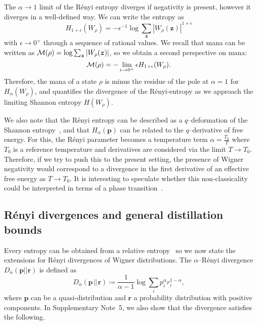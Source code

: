 \documentclass[
onecolumn,
superscriptaddress
]{revtex4-1}
\def\z{\boldsymbol{z}}
\def\r{\boldsymbol{r}}
\def\p{\boldsymbol{p}}
\def\M{{\cal M}}
\begin{document}
The $\alpha \rightarrow 1$ limit of the R\'{e}nyi entropy diverges if negativity is present, however it diverges in a well-defined way. We can write the entropy as 
\begin{equation}
	H_{1+\epsilon}(W_\rho) = -\epsilon^{-1} \log \sum_{\z} |W_\rho (\z)|^{1+\epsilon}
\end{equation} 
with $\epsilon \rightarrow 0^+$ through a sequence of rational values. We recall that mana can be written as $\M(\rho) = \log \sum_{\z} |W_\rho(\z)|$, so we obtain a second perspective on mana:
\begin{equation}\label{eq:mana-divergence}
	\M(\rho) = -\lim_{\epsilon \rightarrow 0^+} \epsilon H_{1+\epsilon}(W_\rho).
\end{equation}
Therefore, the mana of a state $\rho$ is minus the residue of the pole at $\alpha=1$ for $H_\alpha(W_\rho)$, and quantifies the divergence of the R\'{e}nyi-entropy as we approach the limiting Shannon entropy $H(W_\rho)$. 

We also note that the R\'{e}nyi entropy can be described as a $q$--deformation of the Shannon entropy~\cite{baez2011renyi}, and that $H_\alpha(\p)$ can be related to the $q$--derivative of free energy.  For this, the R\'{e}nyi parameter becomes a temperature term $\alpha = \frac{T_0}{T}$ where $T_0$ is a reference temperature and derivatives are considered via the limit $T \rightarrow T_0$. Therefore, if we try to push this to the present setting, the presence of Wigner negativity would correspond to a divergence in the first derivative of an effective free energy as $T \rightarrow T_0$. It is interesting to speculate whether this non-classicality could be interpreted in terms of a phase transition~\cite{domb2000phase}.

\subsection*{R\'{e}nyi divergences and general distillation bounds}
Every entropy can be obtained from a relative entropy~\cite{Gour_2020} so we now state the extensions for R\'{e}nyi divergences of Wigner distributions.
The $\alpha$--R\'{e}nyi divergence $D_\alpha(\p||\r)$ is defined as
\begin{equation}\label{eq:D}
	D_\alpha(\p \hspace{1pt}||\hspace{1pt} \r) \coloneqq \frac{1}{\alpha-1} \log \sum_i p_i^\alpha r_i^{1-\alpha},
\end{equation}
where $\p$ can be a quasi-distribution and $\r$ a probability distribution with positive components. In Supplementary Note~5, we also show that the divergence satisfies the following.
\end{document}
